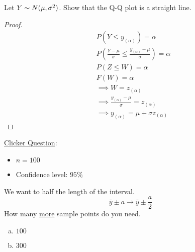 Let $ Y \thicksim N(\mu,\sigma^2) $. Show that the Q-Q plot is a straight line.
\begin{proof}
    \begin{align*}
         & P(Y\leqslant y_{(\alpha)})=\alpha                                                      \\
         & P\left( \frac{Y-\mu}{\sigma} \leqslant \frac{y_{(\alpha)}-\mu}{\sigma}  \right)=\alpha \\
         & P(Z\leqslant W)=\alpha                                                                 \\
         & F(W)=\alpha                                                                            \\
         & \implies W=z_{(\alpha)}                                                                \\
         & \implies \frac{y_{(\alpha)}-\mu}{\sigma}=z_{(\alpha)}                                  \\
         & \implies y_{(\alpha)}=\mu+\sigma z_{(\alpha)}
    \end{align*}
\end{proof}

\underline{Clicker Question}:
\begin{itemize}
    \item $ n=100 $
    \item Confidence level: $ 95\% $
\end{itemize}
We want to half the length of the interval.
\[ \bar{y}\pm a\rightarrow \bar{y}\pm \frac{a}{2} \] How many
\underline{more} sample points do you need.
\begin{enumerate}[(a)]
    \item $ 100 $
    \item $ 300 $
\end{enumerate}
